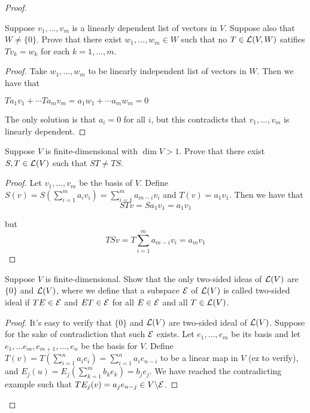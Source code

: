 \documentclass{extarticle}
\begin{document}
\begin{proof}
\begin{problem}{15}
    Suppose \(v_1, \ldots, v_m\) is a linearly dependent list of vectors in \(V\). Suppose also that 
    \(W \neq \{0\}\). Prove that there exist \(w_1, \ldots, w_m \in W\) such that no 
    \(T \in \mathcal{L}(V, W)\) satifies \(Tv_k = w_k\) for each \(k = 1, \ldots, m\). 
\end{problem}

\begin{proof}
Take \(w_1, \ldots, w_m\) to be linearly independent list of vectors in \(W\). Then we have that 

\(Ta_1 v_1 + \cdots T a_m v_m = a_1 w_1 + \cdots a_m w_m = 0\)

The only solution is that \(a_i = 0\) for all \(i\), but this contradicts that \(v_1, \ldots, v_m\)
is linearly dependent. 

\end{proof}



\begin{problem}{16}
    Suppose \(V\) is finite-dimensional with \(\dim V > 1\). Prove that there exist \(S, T \in \mathcal{L}(V)\)
    such that \(ST \neq TS\). 
\end{problem}

\begin{proof}
Let \(v_1, \ldots, v_m\) be the basis of \(V\). Define \(S (v) = S(\sum_{i=1}^{m}a_i v_i)
= \sum_{i=1}^{m} a_{m - i} v_i\) and \(T(v) = a_1 v_1\). Then we have that 
\[ST v = S a_1v_1 = a_1 v_1\]

but 
\[T S v = T \sum_{i=1}^{m} a_{m - i} v_i = a_m v_1\]
\end{proof}

\begin{problem}{17}
    Suppose \(V\) is finite-dimensional. Show that the only two-sided ideas of \(\mathcal{L}(V)\)
    are \(\{0\}\) and \(\mathcal{L}(V)\), where we define that a subspace \(\mathcal{E}\) of \(\mathcal{L}(V)\)
    is called two-sided ideal if \(T E \in \mathcal{E}\) and \(ET \in \mathcal{E}\) for all \(E \in \mathcal{E}\)
    and all \(T \in \mathcal{L}(V)\). 
\end{problem}

\begin{proof}
It's easy to verify that \(\{0\}\) and \(\mathcal{L}(V)\) are two-sided ideal of \(\mathcal{L}(V)\). Suppose for 
the sake of contradiction that such \(\mathcal{E}\) exists. Let \(e_1, \ldots, e_m\) be its basis and let 
\(e_1, \ldots e_m, e_{m+1}, \ldots, e_n\) be the basis for \(V\). Define \(T(v) = 
T(\sum_{i=1}^{n}a_i e_i) = \sum_{i=1}^{n}a_i e_{n-i}\) to be a linear map in \(V\) (ez to verify), and 
\(E_j (u) = E_j(\sum_{k=1}^{m}b_k e_k) = b_j e_j\). We have reached the contradicting example such 
that \(TE_j (v) = a_j e_{n - j} \in V \backslash \mathcal{E}\). 

\end{proof}

\end{proof}
\end{document}
